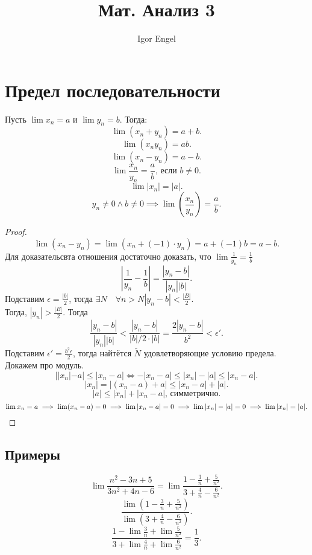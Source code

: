 \documentclass[11pt, oneside]{article}   	%
\title{Мат. Анализ 3}
\author{Igor Engel}
\date{}
\begin{document}
\maketitle
\section{Предел последовательности}
    
\begin{theorem}
    Пусть $\lim x_n=a$ и  $\lim y_n = b$. Тогда:
    \[ \lim \left( x_n+y_n \right) =a+b .\]
    \[ \lim \left( x_ny_n \right) =ab .\]
    \[ \lim\left( x_n-y_n \right)=a-b  .\]
    \[ \lim \frac{x_n}{y_n} = \frac{a}{b}\text{, если $b\neq 0$} .\]
    \[\lim |x_n|=|a| .\] 
    \[ y_n \neq 0\land b\neq 0 \implies \lim\left( \frac{x_n}{y_n} \right) = \frac{a}{b} .\]
    \begin{proof}
        \[ \lim (x_n-y_n) = \lim(x_n+(-1)\cdot y_n) = a+(-1)b=a-b .\]
        Для доказательсвта отношения достаточно доказать, что $\lim \frac{1}{y_n} = \frac{1}{b}$
        \[ \left|\frac{1}{y_n}-\frac{1}{b}\right|=\frac{|y_n-b|}{|y_n| |b|} .\]
        Подставим $\epsilon = \frac{|b|}{2}$, тогда $\exists{N}\quad \forall{n > N} |y_n-b|<\frac{|B|}{2}$.\\
        Тогда, $|y_n| > \frac{|B|}{2}$. Тогда
        \[ \frac{|y_n-b|}{|y_n| |b|} < \frac{|y_n-b|}{|b| / 2\cdot |b|} = \frac{2|y_n-b|}{b^2} < \epsilon'.\]
        Подставим $\epsilon'=\frac{b^2\epsilon}{2}$, тогда найтётся $ \tilde{N}$ удовлетворяющие условию предела.\\
        Докажем про модуль. 
        \[ | |x_n|-a| \le |x_n-a| \iff -|x_n-a| \le |x_n|-|a|\le |x_n-a|.\]
        \[ |x_n|=|(x_n-a)+a| \le |x_n-a|+|a| .\]
        \[ |a| \le  |x_n|+|x_n-a|\text{, симметрично} .\]
        \[ \lim x_n=a \implies \lim (x_n-a) = 0 \implies \lim |x_n-a| = 0 \implies \lim |x_n|-|a| = 0 \implies \lim |x_n| = |a| .\qedhere\] 
    \end{proof} 
    \subsection{Примеры}
    \[ \lim \frac{n^2-3n+5}{3n^2+4n-6}=\lim \frac{1-\frac{3}{n}+\frac{5}{n^2}}{3+\frac{4}{n}-\frac{6}{n^2}} .\]
    \[ \frac{\lim (1-\frac{3}{n}+\frac{5}{n^2})}{\lim (3+\frac{4}{n}-\frac{6}{n^2})}.\]
    \[ \frac{1-\lim \frac{3}{n} + \lim \frac{5}{n^2}}{3+\lim \frac{4}{n} + \lim \frac{6}{n^2}} = \frac{1}{3} .\] 
\end{theorem}
\end{document}
